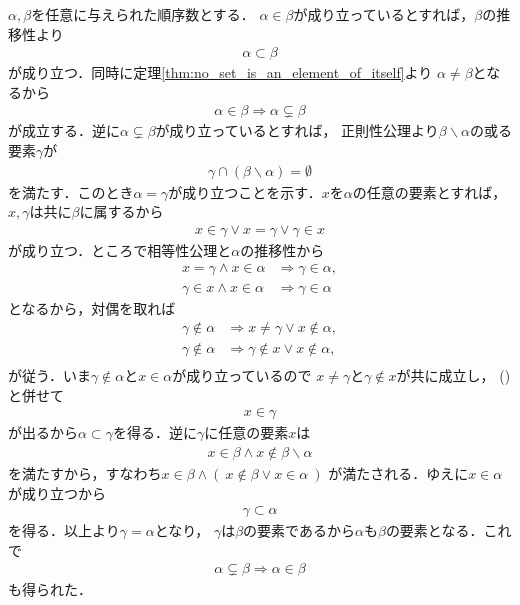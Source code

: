 	\begin{prf}
		$\alpha,\beta$を任意に与えられた順序数とする．
		$\alpha \in \beta$が成り立っているとすれば，$\beta$の推移性より
		\begin{align}
			\alpha \subset \beta
		\end{align}
		が成り立つ．同時に定理\ref{thm:no_set_is_an_element_of_itself}より
		$\alpha \neq \beta$となるから
		\begin{align}
			\alpha \in \beta \Longrightarrow \alpha \subsetneq \beta
		\end{align}
		が成立する．逆に$\alpha \subsetneq \beta$が成り立っているとすれば，
		正則性公理より$\beta \backslash \alpha$の或る要素$\gamma$が
		\begin{align}
			\gamma \cap (\beta \backslash \alpha) = \emptyset
		\end{align}
		を満たす．このとき$\alpha = \gamma$が成り立つことを示す．$x$を$\alpha$の任意の要素とすれば，
		$x,\gamma$は共に$\beta$に属するから
		\begin{align}
			x \in \gamma \vee x = \gamma \vee \gamma \in x
			\label{eq:thm_element_and_proper_subset_correspond_between_ordinal_numbers_1}
		\end{align}
		が成り立つ．ところで相等性公理と$\alpha$の推移性から
		\begin{align}
			x = \gamma \wedge x \in \alpha &\Longrightarrow \gamma \in \alpha, \\
			\gamma \in x \wedge x \in \alpha &\Longrightarrow \gamma \in \alpha
		\end{align}
		となるから，対偶を取れば
		\begin{align}
			\gamma \notin \alpha &\Longrightarrow x \neq \gamma \vee x \notin \alpha, \\
			\gamma \notin \alpha &\Longrightarrow \gamma \notin x \vee x \notin \alpha, \\
		\end{align}
		が従う．いま$\gamma \notin \alpha$と$x \in \alpha$が成り立っているので
		$x \neq \gamma$と$\gamma \notin x$が共に成立し，
		()と併せて
		\begin{align}
			x \in \gamma
		\end{align}
		が出るから$\alpha \subset \gamma$を得る．逆に$\gamma$に任意の要素$x$は
		\begin{align}
			x \in \beta \wedge x \notin \beta \backslash \alpha
		\end{align}
		を満たすから，すなわち$x \in \beta \wedge (\ x \notin \beta \vee x \in \alpha\ )$
		が満たされる．ゆえに$x \in \alpha$が成り立つから
		\begin{align}
			\gamma \subset \alpha
		\end{align}
		を得る．以上より$\gamma = \alpha$となり，
		$\gamma$は$\beta$の要素であるから$\alpha$も$\beta$の要素となる．これで
		\begin{align}
			\alpha \subsetneq \beta \Longrightarrow \alpha \in \beta
		\end{align}
		も得られた．
		\QED
	\end{prf}
	
